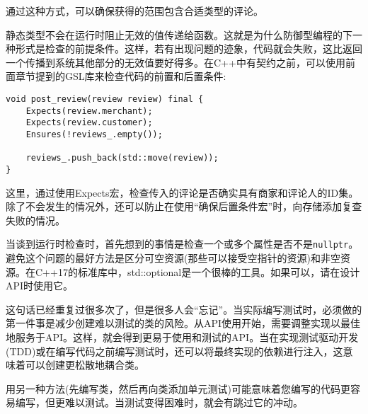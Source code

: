 通过这种方式，可以确保获得的范围包含合适类型的评论。

静态类型不会在运行时阻止无效的值传递给函数。这就是为什么防御型编程的下一种形式是检查的前提条件。这样，若有出现问题的迹象，代码就会失败，这比返回一个传播到系统其他部分的无效值要好得多。在C++中有契约之前，可以使用前面章节提到的GSL库来检查代码的前置和后置条件:

\begin{lstlisting}[style=styleCXX]
void post_review(review review) final {
	Expects(review.merchant);
	Expects(review.customer);
	Ensures(!reviews_.empty());
	
	reviews_.push_back(std::move(review));
}
\end{lstlisting}

这里，通过使用Expects宏，检查传入的评论是否确实具有商家和评论人的ID集。除了不会发生的情况外，还可以防止在使用“确保后置条件宏”时，向存储添加复查失败的情况。

当谈到运行时检查时，首先想到的事情是检查一个或多个属性是否不是\texttt{nullptr}。避免这个问题的最好方法是区分可空资源(那些可以接受空指针的资源)和非空资源。在C++17的标准库中，std::optional是一个很棒的工具。如果可以，请在设计API时使用它。


这句话已经重复过很多次了，但是很多人会“忘记”。当实际编写测试时，必须做的第一件事是减少创建难以测试的类的风险。从API使用开始，需要调整实现以最佳地服务于API。这样，就会得到更易于使用和测试的API。当在实现测试驱动开发(TDD)或在编写代码之前编写测试时，还可以将最终实现的依赖进行注入，这意味着可以创建更松散地耦合类。

用另一种方法(先编写类，然后再向类添加单元测试)可能意味着您编写的代码更容易编写，但更难以测试。当测试变得困难时，就会有跳过它的冲动。













